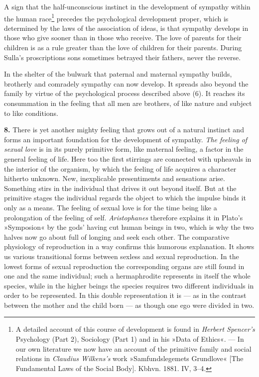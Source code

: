 \documentclass[12pt,a4paper]{book}
\newcommand{\opage}[1]{\marginnote{\footnotesize\textit{[#1]}}}
\begin{document}
A sign that the half-unconscious instinct in the development of sympathy
within the human race\footnote{A detailed account of this course of
development is found in \emph{Herbert Spencer's} Psychology (Part 2),
Sociology (Part 1) and in his »Data of Ethics«. --- In our own
literature we now have an account of the primitive family and social
relations in \emph{Claudius Wilkens's} work »Samfundslegemets
Grundlove« [The Fundamental Laws of the Social Body]. Kbhvn. 1881. IV,
3--4.} precedes the psychological development proper, which is
determined by the laws of the association of ideas, is that sympathy
develops in those who give sooner than in those who receive. The love of
parents for their children is as a rule greater than the love of
children for their parents. During Sulla's proscriptions sons sometimes
betrayed their fathers, never the reverse.

In the shelter of the bulwark that paternal and maternal sympathy
builds, brotherly and comradely sympathy can now develop. It spreads
also beyond the family by virtue of the psychological process described
above (6). It reaches its consummation in the feeling that all men are
brothers, of like nature and subject to like conditions.

\textbf{8.} There is yet another mighty feeling that grows out of a
natural instinct and forms an important foundation for the development
of sympathy. \emph{The feeling of sexual love} is in its purely
primitive form, like maternal feeling, a factor in the general feeling
of life. Here too the first stirrings are connected with upheavals in
the interior of the organism, by which the feeling of life acquires a
character hitherto unknown. New, inexplicable presentiments and
sensations arise. Something stirs in the individual that drives it out
beyond itself. But at the
\opage{301}primitive stages the individual regards the object to which
the impulse binds it only as a means. The feeling of sexual love is for
the time being like a prolongation of the feeling of self.
\emph{Aristophanes} therefore explains it in Plato's »Symposion« by the
gods' having cut human beings in two, which is why the two halves now go
about full of longing and seek each other. The comparative physiology
of reproduction in a way confirms this humorous explanation. It shows us
various transitional forms between sexless and sexual reproduction. In
the lowest forms of sexual reproduction the corresponding organs are
still found in one and the same individual; such a hermaphrodite
represents in itself the whole species, while in the higher beings the
species requires two different individuals in order to be represented.
In this double representation it is --- as in the contrast between the
mother and the child born --- as though one ego were divided in two.
\end{document}

